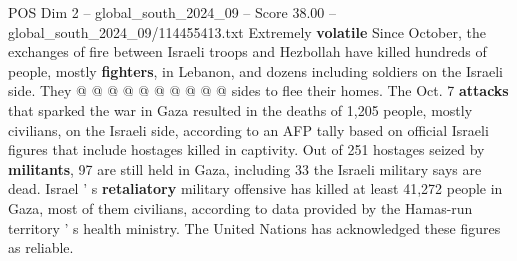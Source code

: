\begin{textsample}{POS Dim 2 – global\_south\_2024\_09 – Score 38.00 – global\_south\_2024\_09/114455413.txt}
Extremely \textbf{volatile} Since October, the exchanges of fire between Israeli troops and Hezbollah have killed hundreds of people, mostly \textbf{fighters}, in Lebanon, and dozens including soldiers on the Israeli side.
They @ @ @ @ @ @ @ @ @ @ sides to flee their homes.
The Oct. 7 \textbf{attacks} that sparked the war in Gaza resulted in the deaths of 1,205 people, mostly civilians, on the Israeli side, according to an AFP tally based on official Israeli figures that include hostages killed in captivity.
Out of 251 hostages seized by \textbf{militants}, 97 are still held in Gaza, including 33 the Israeli military says are dead.
Israel ' s \textbf{retaliatory} military offensive has killed at least 41,272 people in Gaza, most of them civilians, according to data provided by the Hamas-run territory ' s health ministry.
The United Nations has acknowledged these figures as reliable.

\end{textsample}
